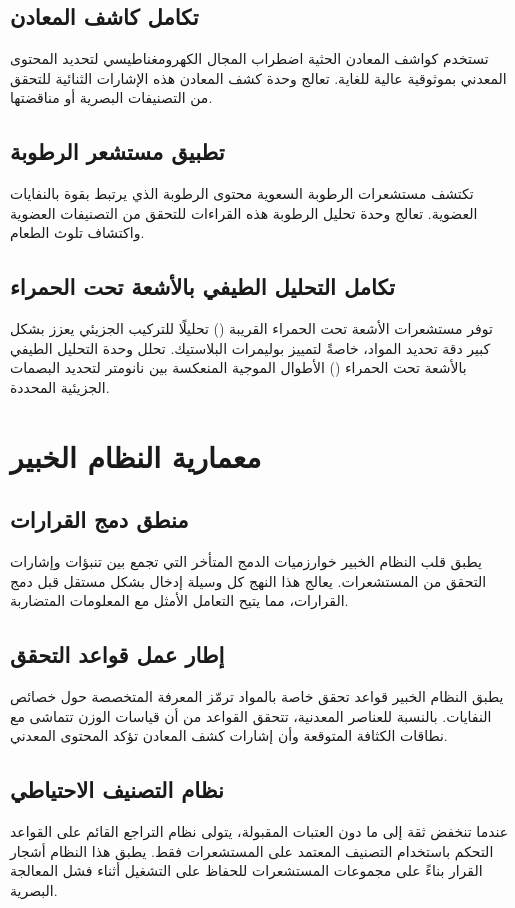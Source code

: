 \documentclass[11pt, a4paper]{article}
\begin{document}
\begin{RTL}
\subsection{تكامل كاشف المعادن}
تستخدم كواشف المعادن الحثية اضطراب المجال الكهرومغناطيسي لتحديد المحتوى المعدني بموثوقية عالية للغاية. تعالج وحدة كشف المعادن هذه الإشارات الثنائية للتحقق من التصنيفات البصرية أو مناقضتها.

\subsection{تطبيق مستشعر الرطوبة}
تكتشف مستشعرات الرطوبة السعوية محتوى الرطوبة الذي يرتبط بقوة بالنفايات العضوية. تعالج وحدة تحليل الرطوبة هذه القراءات للتحقق من التصنيفات العضوية واكتشاف تلوث الطعام.

\subsection{تكامل التحليل الطيفي بالأشعة تحت الحمراء}
توفر مستشعرات الأشعة تحت الحمراء القريبة () تحليلًا للتركيب الجزيئي يعزز بشكل كبير دقة تحديد المواد، خاصةً لتمييز بوليمرات البلاستيك. تحلل وحدة التحليل الطيفي بالأشعة تحت الحمراء () الأطوال الموجية المنعكسة بين  نانومتر لتحديد البصمات الجزيئية المحددة.

\section{معمارية النظام الخبير}
\subsection{منطق دمج القرارات}
يطبق قلب النظام الخبير خوارزميات الدمج المتأخر التي تجمع بين تنبؤات  وإشارات التحقق من المستشعرات. يعالج هذا النهج كل وسيلة إدخال بشكل مستقل قبل دمج القرارات، مما يتيح التعامل الأمثل مع المعلومات المتضاربة.

\subsection{إطار عمل قواعد التحقق}
يطبق النظام الخبير قواعد تحقق خاصة بالمواد ترمّز المعرفة المتخصصة حول خصائص النفايات. بالنسبة للعناصر المعدنية، تتحقق القواعد من أن قياسات الوزن تتماشى مع نطاقات الكثافة المتوقعة وأن إشارات كشف المعادن تؤكد المحتوى المعدني.

\subsection{نظام التصنيف الاحتياطي}
عندما تنخفض ثقة  إلى ما دون العتبات المقبولة، يتولى نظام التراجع القائم على القواعد التحكم باستخدام التصنيف المعتمد على المستشعرات فقط. يطبق هذا النظام أشجار القرار بناءً على مجموعات المستشعرات للحفاظ على التشغيل أثناء فشل المعالجة البصرية.


\end{RTL}
\end{document}
